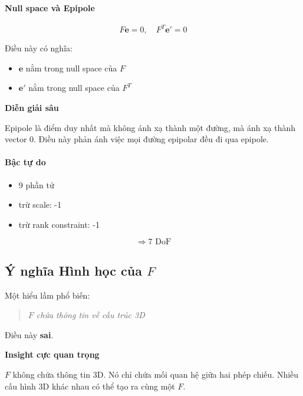 \paragraph{Null space và Epipole}

\[
F \mathbf{e} = 0, \quad F^T \mathbf{e}' = 0
\]

Điều này có nghĩa:

\begin{itemize}
	\item $\mathbf{e}$ nằm trong null space của $F$
	\item $\mathbf{e}'$ nằm trong null space của $F^T$
\end{itemize}

\begin{mdframed}[style=infobox]
	\textbf{Diễn giải sâu}
	
	Epipole là điểm duy nhất mà không ánh xạ thành một đường, mà ánh xạ thành vector 0. Điều này phản ánh việc mọi đường epipolar đều đi qua epipole.
\end{mdframed}

\paragraph{Bậc tự do}

\begin{itemize}
	\item 9 phần tử
	\item trừ scale: -1
	\item trừ rank constraint: -1
\end{itemize}

\[
\Rightarrow 7 \text{ DoF}
\]

\subsection{Ý nghĩa Hình học của $F$}
\label{subsec:F_geometry_meaning}

Một hiểu lầm phổ biến:

\begin{quote}
	\textit{$F$ chứa thông tin về cấu trúc 3D}
\end{quote}

Điều này \textbf{sai}.

\begin{mdframed}[style=infobox]
	\textbf{Insight cực quan trọng}
	
	$F$ không chứa thông tin 3D. Nó chỉ chứa mối quan hệ giữa hai phép chiếu. Nhiều cấu hình 3D khác nhau có thể tạo ra cùng một $F$.
\end{mdframed}

